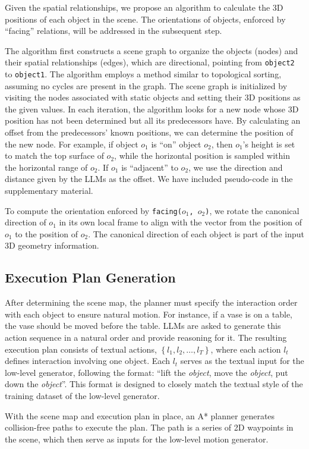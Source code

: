 

Given the spatial relationships, we propose an algorithm to calculate the 3D positions of each object in the scene. The orientations of objects, enforced by ``facing'' relations, will be addressed in the subsequent step. 

The algorithm first constructs a scene graph \cite{johnson2015image} to organize the objects (nodes) and their spatial relationships (edges), which are directional, pointing from \texttt{object2} to \texttt{object1}. The algorithm employs a method similar to topological sorting, assuming no cycles are present in the graph. The scene graph is initialized by visiting the nodes associated with static objects and setting their 3D positions as the given values. In each iteration, the algorithm looks for a new node whose 3D position has not been determined but all its predecessors have. By calculating an offset from the predecessors' known positions, we can determine the position of the new node. For example, if object $o_1$ is ``on'' object $o_2$, then $o_1$'s height is set to match the top surface of $o_2$, while the horizontal position is sampled within the horizontal range of $o_2$. If $o_1$ is ``adjacent'' to $o_2$, we use the direction and distance given by the LLMs as the offset. We have included pseudo-code in the supplementary material.

To compute the orientation enforced by \texttt{facing($o_1$, $o_2$)}, we rotate the canonical direction of $o_1$ in its own local frame to align with the vector from the position of $o_1$ to the position of $o_2$. The canonical direction of each object is part of the input 3D geometry information.


\subsection{Execution Plan Generation}
\label{subsec:plan}
 
After determining the scene map, the planner must specify the interaction order with each object to ensure natural motion. For instance, if a vase is on a table, the vase should be moved before the table. 
LLMs are asked to generate this action sequence in a natural order and provide reasoning for it.
The resulting execution plan consists of textual actions, $\left\{l_1, l_2, \dots, l_{T}\right\}$, where each action $l_t$ defines interaction involving one object. 
Each $l_t$ serves as the textual input for the low-level generator, following the format: ``lift the \textit{object}, move the \textit{object}, put down the \textit{object}''. This format is designed to closely match the textual style of the training dataset of the low-level generator.

With the scene map and execution plan in place, an A* planner generates collision-free paths to execute the plan. The path is a series of 2D waypoints in the scene, which then serve as inputs for the low-level motion generator.
